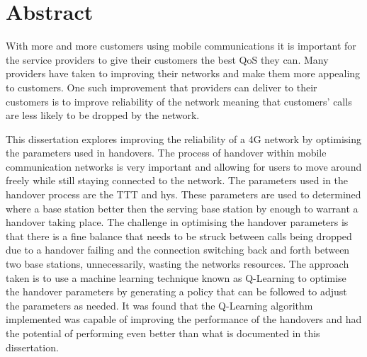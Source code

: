 \chapter*{Abstract}
With more and more customers using mobile communications it is important for the service providers to give their customers the best \ac{QoS} they can. Many providers have taken to improving their networks and make them more appealing to customers. One such improvement that providers can deliver to their customers is to improve reliability of the network meaning that customers' calls are less likely to be dropped by the network.

This dissertation explores improving the reliability of a 4G network by optimising the parameters used in handovers. The process of handover within mobile communication networks is very important and allowing for users to move around freely while still staying connected to the network. The parameters used in the handover process are the \ac{TTT} and \ac{hys}. These parameters are used to determined where a base station better then the serving base station by enough to warrant a handover taking place. The challenge in optimising the handover parameters is that there is a fine balance that needs to be struck between calls being dropped due to a handover failing and the connection switching back and forth between two base stations, unnecessarily, wasting the networks resources. The approach taken is to use a machine learning technique known as Q-Learning to optimise the handover parameters by generating a policy that can be followed to adjust the parameters as needed. It was found that the Q-Learning algorithm implemented was capable of improving the performance of the handovers and had the potential of performing even better than what is documented in this dissertation.
\pagebreak
